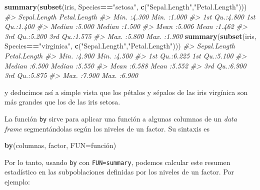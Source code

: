 \documentclass[
]{book}
\newenvironment{Shaded}{\begin{snugshade}}{\end{snugshade}}
\newcommand{\CommentTok}[1]{\textcolor[rgb]{0.56,0.35,0.01}{\textit{#1}}}
\newcommand{\DataTypeTok}[1]{\textcolor[rgb]{0.13,0.29,0.53}{#1}}
\newcommand{\KeywordTok}[1]{\textcolor[rgb]{0.13,0.29,0.53}{\textbf{#1}}}
\newcommand{\NormalTok}[1]{#1}
\newcommand{\OperatorTok}[1]{\textcolor[rgb]{0.81,0.36,0.00}{\textbf{#1}}}
\newcommand{\StringTok}[1]{\textcolor[rgb]{0.31,0.60,0.02}{#1}}
\theoremstyle{definition}
\theoremstyle{definition}
\theoremstyle{definition}
\theoremstyle{remark}
\begin{document}
\begin{Shaded}
\begin{Highlighting}[]
\KeywordTok{summary}\NormalTok{(}\KeywordTok{subset}\NormalTok{(iris, Species}\OperatorTok{==}\StringTok{"setosa"}\NormalTok{, }\KeywordTok{c}\NormalTok{(}\StringTok{"Sepal.Length"}\NormalTok{,}\StringTok{"Petal.Length"}\NormalTok{)))}
\CommentTok{\#\textgreater{}   Sepal.Length    Petal.Length  }
\CommentTok{\#\textgreater{}  Min.   :4.300   Min.   :1.000  }
\CommentTok{\#\textgreater{}  1st Qu.:4.800   1st Qu.:1.400  }
\CommentTok{\#\textgreater{}  Median :5.000   Median :1.500  }
\CommentTok{\#\textgreater{}  Mean   :5.006   Mean   :1.462  }
\CommentTok{\#\textgreater{}  3rd Qu.:5.200   3rd Qu.:1.575  }
\CommentTok{\#\textgreater{}  Max.   :5.800   Max.   :1.900}
\KeywordTok{summary}\NormalTok{(}\KeywordTok{subset}\NormalTok{(iris, Species}\OperatorTok{==}\StringTok{"virginica"}\NormalTok{, }\KeywordTok{c}\NormalTok{(}\StringTok{"Sepal.Length"}\NormalTok{,}\StringTok{"Petal.Length"}\NormalTok{)))}
\CommentTok{\#\textgreater{}   Sepal.Length    Petal.Length  }
\CommentTok{\#\textgreater{}  Min.   :4.900   Min.   :4.500  }
\CommentTok{\#\textgreater{}  1st Qu.:6.225   1st Qu.:5.100  }
\CommentTok{\#\textgreater{}  Median :6.500   Median :5.550  }
\CommentTok{\#\textgreater{}  Mean   :6.588   Mean   :5.552  }
\CommentTok{\#\textgreater{}  3rd Qu.:6.900   3rd Qu.:5.875  }
\CommentTok{\#\textgreater{}  Max.   :7.900   Max.   :6.900}
\end{Highlighting}
\end{Shaded}

y deducimos así a simple vista que los pétalos y sépalos de las iris virgínica son más grandes que los de las iris setosa.

La función \texttt{by} sirve para aplicar una función a algunas columnas de un \emph{data frame} segmentándolas según los niveles de un factor. Su sintaxis es

\begin{Shaded}
\begin{Highlighting}[]
\KeywordTok{by}\NormalTok{(columnas, factor, }\DataTypeTok{FUN=}\NormalTok{función)}
\end{Highlighting}
\end{Shaded}

Por lo tanto, usando \texttt{by} con \texttt{FUN=summary}, podemos calcular este resumen estadístico en las subpoblaciones definidas por los niveles de un factor. Por ejemplo:
\end{document}
